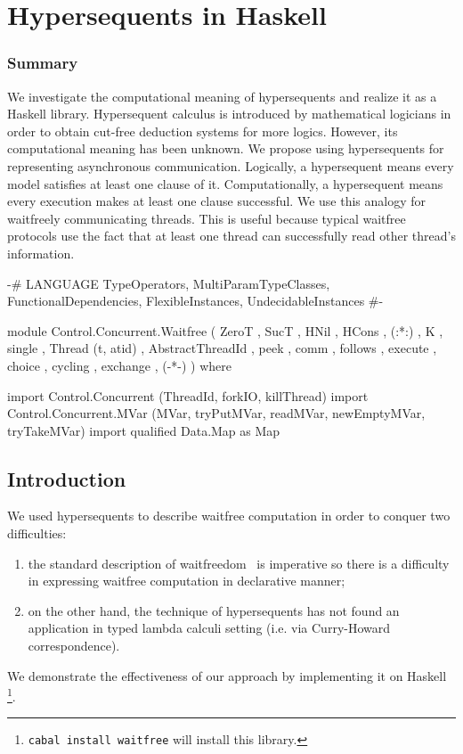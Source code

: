 \chapter{Hypersequents in Haskell}

\subsection{Summary}

 We investigate the computational meaning of hypersequents and realize
 it as a Haskell library.
 Hypersequent calculus is introduced by mathematical logicians in order
 to obtain cut-free deduction systems for more logics.
 However, its
 computational meaning has been unknown.  We propose using hypersequents
 for representing asynchronous communication.  Logically, a hypersequent
 means every model satisfies at least one clause of it.
 Computationally, a hypersequent
 means every execution makes at least one clause
 successful.
 We use this analogy
 for waitfreely communicating threads.  This is useful
 because typical waitfree protocols use the fact that at least one thread
 can successfully read other thread's information.

\begin{code}
 {-# LANGUAGE TypeOperators, MultiParamTypeClasses, FunctionalDependencies, FlexibleInstances, UndecidableInstances #-}

module Control.Concurrent.Waitfree
    ( ZeroT
    , SucT
    , HNil
    , HCons
    , (:*:)
    , K
    , single
    , Thread (t, atid)
    , AbstractThreadId
    , peek
    , comm
    , follows
    , execute
    , choice
    , cycling
    , exchange
    , (-*-)
    )
    where

import Control.Concurrent (ThreadId, forkIO, killThread)
import Control.Concurrent.MVar (MVar, tryPutMVar, readMVar,
 newEmptyMVar, tryTakeMVar)
import qualified Data.Map as Map
\end{code}


\section{Introduction}

We used hypersequents to describe waitfree computation in order to
conquer two difficulties:
\begin{enumerate}
 \item the standard description of waitfreedom~\cite{multiprocessor}
is imperative so there is a difficulty in
expressing waitfree computation in declarative manner;
 \item  on the
other hand, the technique of hypersequents has not found an
application in typed lambda calculi setting (i.e. via Curry-Howard correspondence).
\end{enumerate}
We demonstrate the effectiveness of our approach by implementing it on
Haskell%
\footnote{\texttt{cabal install waitfree} will install this library.}.

